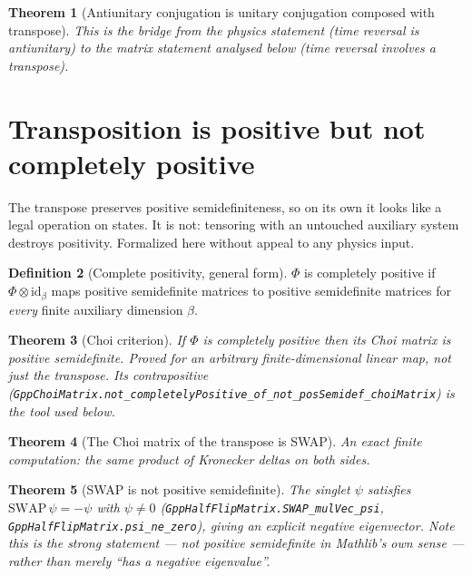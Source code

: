 \documentclass{report}
\newtheorem{theorem}{Theorem}[chapter]
\theoremstyle{definition}
\newtheorem{definition}[theorem]{Definition}
\begin{document}
\begin{theorem}[Antiunitary conjugation is unitary conjugation composed with transpose]
  \label{thm:antiunitary-transpose}
  \leanok
  This is the bridge from the physics statement (time reversal is antiunitary) to the
  matrix statement analysed below (time reversal involves a transpose).
\end{theorem}

\section{Transposition is positive but not completely positive}

The transpose preserves positive semidefiniteness, so on its own it looks like a legal
operation on states. It is not: tensoring with an untouched auxiliary system destroys
positivity. Formalized here without appeal to any physics input.

\begin{definition}[Complete positivity, general form]
  \label{def:completely-positive}
  \leanok
  $\Phi$ is completely positive if $\Phi \otimes \mathrm{id}_\beta$ maps positive
  semidefinite matrices to positive semidefinite matrices for \emph{every} finite
  auxiliary dimension $\beta$.
\end{definition}

\begin{theorem}[Choi criterion]
  \label{thm:choi-criterion}
  \leanok
  If $\Phi$ is completely positive then its Choi matrix is positive semidefinite.
  Proved for an \emph{arbitrary} finite-dimensional linear map, not just the transpose.
  Its contrapositive
  (\texttt{GppChoiMatrix.not\_completelyPositive\_of\_not\_posSemidef\_choiMatrix}) is
  the tool used below.
\end{theorem}

\begin{theorem}[The Choi matrix of the transpose is SWAP]
  \label{thm:choi-transpose-swap}
  \leanok
  An exact finite computation: the same product of Kronecker deltas on both sides.
\end{theorem}

\begin{theorem}[SWAP is not positive semidefinite]
  \label{thm:swap-not-psd}
  \leanok
  The singlet $\psi$ satisfies $\mathrm{SWAP}\,\psi = -\psi$ with $\psi \neq 0$
  (\texttt{GppHalfFlipMatrix.SWAP\_mulVec\_psi},
  \texttt{GppHalfFlipMatrix.psi\_ne\_zero}), giving an explicit negative eigenvector.
  Note this is the strong statement --- \emph{not} positive semidefinite in Mathlib's own
  sense --- rather than merely ``has a negative eigenvalue''.
\end{theorem}
\end{document}
